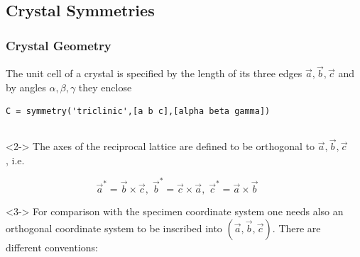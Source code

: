 \subsection*{Crystal Symmetries}
\label{sec:crystal-symmetries}


\begin{frame}[fragile]
  \frametitle{Crystal Geometry}

  The unit cell of a crystal is specified by the length of its three edges
  $\vec a, \vec b, \vec c$ and by angles $\alpha, \beta, \gamma$ they enclose

  \begin{lstlisting}
C = symmetry('triclinic',[a b c],[alpha beta gamma])
  \end{lstlisting}

  \begin{columns}
    \begin{column}{7.5cm}

      \begin{uncoverenv}<2->
        The axes of the reciprocal lattice are defined to be orthogonal to $\vec a,
        \vec b, \vec c$, i.e.

\begin{equation*}
  \vec a^{*} = \vec b \times \vec c, \;
  \vec b^{*} = \vec c \times \vec a, \;
  \vec c^{*} = \vec a \times \vec b
\end{equation*}
      \end{uncoverenv}



      \begin{uncoverenv}<3->
        For comparison with the specimen coordinate system one needs also an
        orthogonal coordinate system to be inscribed into $(\vec a, \vec b,
        \vec c)$.  \alert{There are different conventions:}
      \end{uncoverenv}


    \end{column}

    \begin{column}{4.5cm}
\end{column}
\end{columns}
\end{frame}
